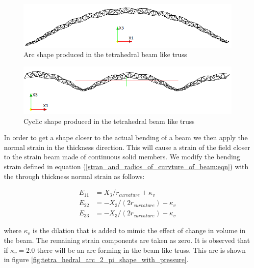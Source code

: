 \begin{figure} 
\centering
\includegraphics[width=5.0in]{./chap_5_active_trusses/images_linear_tetrahedral/tetra_hedral_arc_pi_shape.png}
\caption{Arc shape produced in the tetrahedral beam like truss}
\label{fig:tetra_hedral_arc_pi_shape}
\end{figure}  


\begin{figure} 
\centering
\includegraphics[width=5.0in]{./chap_5_active_trusses/images_linear_tetrahedral/tetra_hedral_arc_2_pi_shape.png}
\caption{Cyclic shape produced in the tetrahedral beam like truss}
\label{fig:tetra_hedral_arc_2_pi_shape}
\end{figure} 


In order to get a shape closer to the actual bending of a beam we then apply the normal strain in the thickness direction. This will cause a strain of the field closer to the strain beam made of continuous solid members. We modify the bending strain defined in equation (\ref{stran_and_radios_of_curvture_of_beam:eqn}) with the through thickness normal strain as follows: 

\begin{equation}
\begin{aligned}
E_{11}&=X_3/r_{curvature}+\kappa_v \\
E_{22}&=-X_3/(2r_{curvature})+\kappa_v \\
E_{33}&=-X_3/(2r_{curvature})+\kappa_v
\end{aligned}
\label{strain_with_dilation:eqn}
\end{equation}


where $\kappa_v$  is the dilation that is added to mimic the effect of change in volume in the beam. The remaining strain components are taken as zero. It is observed that if $\kappa_v=2.0$ there will be an arc forming in the beam like truss. This arc is shown in figure  \ref{fig:tetra_hedral_arc_2_pi_shape_with_pressure}. 


